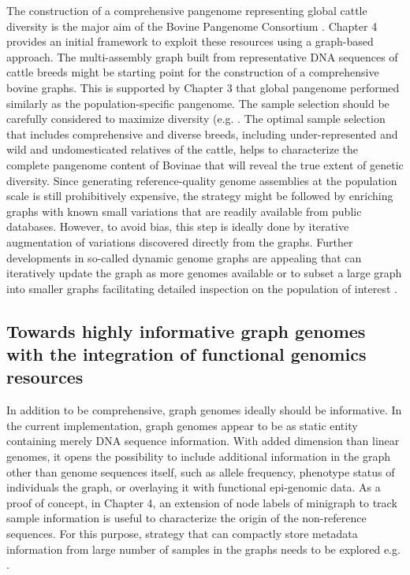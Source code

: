\documentclass[../main.tex]{subfiles}
\begin{document}
The construction of a comprehensive pangenome representing  global cattle diversity is the major aim of the Bovine Pangenome Consortium \citep{heaton2021reference}. Chapter 4 provides an initial framework to exploit these resources using a graph-based approach. The multi-assembly graph built from representative DNA sequences of cattle breeds might be starting point for the construction of a comprehensive bovine graphs. This is supported by Chapter 3 that global pangenome performed similarly as the population-specific pangenome. The sample selection should be carefully considered to maximize diversity (e.g. \citep{Ros-Freixedes2017,ranallo2021optimized}. The optimal sample selection that includes comprehensive and diverse breeds, including under-represented and wild and undomesticated relatives of the cattle, helps to characterize the complete pangenome content of Bovinae that will reveal the true extent of genetic diversity. Since generating reference-quality genome assemblies at the population scale is still prohibitively expensive, the strategy might be followed by enriching graphs with known small variations that are readily available from public databases. However, to avoid bias, this step is ideally done by iterative augmentation of variations discovered directly from the graphs. Further developments in so-called dynamic genome graphs are appealing that can iteratively update the graph as more genomes available or to subset a large graph into smaller graphs facilitating detailed inspection on the population of interest \citep{eizenga2020efficient}.

\subsection*{Towards highly informative graph genomes with the integration of functional genomics resources}

In addition to be comprehensive, graph genomes ideally should be informative. In the current implementation, graph genomes appear to be as static entity containing merely DNA sequence information. With added dimension than linear genomes, it opens the possibility to include additional information in the graph other than genome sequences itself, such as allele frequency, phenotype status of individuals the graph, or overlaying it with functional epi-genomic data. As a proof of concept, in Chapter 4, an extension of node labels of minigraph to track sample information is useful to characterize the origin of the non-reference sequences. For this purpose, strategy that can compactly store metadata information from large number of samples in the graphs needs to be explored e.g. \citet{siren2020haplotype}. 
\end{document}
